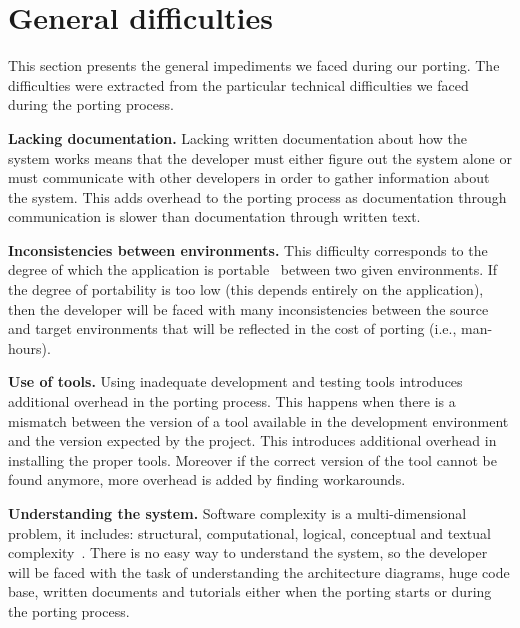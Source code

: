 \section{General difficulties}

This section presents the general impediments we faced during our porting. The
difficulties were extracted from the particular technical difficulties we faced
during the porting process.

\textbf{Lacking documentation.}
Lacking written documentation about how the system works means
that the developer must either figure out the system alone or must communicate
with other developers in order to gather information about the system. This adds
overhead to the porting process as documentation through communication is
slower than documentation through written text.

\textbf{Inconsistencies between environments.}
This difficulty corresponds to the degree of which the application is
portable~\cite{mooney2004developing} between two given environments. If the
degree of portability is too low (this depends entirely on the application), then
the developer will be faced with many inconsistencies between the source and
target environments that will be reflected in the cost of porting (i.e.,
man-hours).

\textbf{Use of tools.}
Using inadequate development and testing tools introduces additional
overhead in the porting process. This happens when there is a mismatch between
the version of a tool available in the development environment and the version
expected by the project. This introduces additional overhead in installing the
proper tools. Moreover if the correct version of the tool cannot be found
anymore, more overhead is added by finding workarounds.

\textbf{Understanding the system.}
Software complexity is a multi-dimensional problem, it includes: structural,
computational, logical, conceptual and textual complexity~\cite{ejiogu}. There
is no easy way to understand the system, so the developer will be faced with the
task of understanding the architecture diagrams, huge code base, written
documents and tutorials either when the porting starts or during the porting
process.
